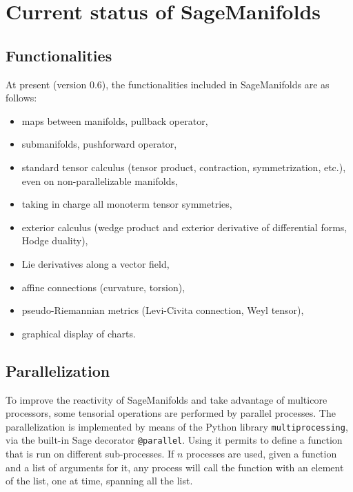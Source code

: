 \documentclass[a4paper]{jpconf}
\newcommand{\soft}[1]{\textsf{#1}}
\newcommand{\code}[1]{\texttt{#1}}
\newcommand{\Sage}{\soft{Sage}}
\newcommand{\SM}{\soft{SageManifolds}}
\begin{document}

\section{Current status of SageManifolds}

\subsection{Functionalities} \label{s:functionalities}
At present (version 0.6), the functionalities included in \SM{} are as
follows:  
\begin{itemize}
\item maps between manifolds, pullback operator,
\item submanifolds, pushforward operator,
\item standard tensor calculus (tensor product, 
contraction, symmetrization, etc.), even on non-parallelizable manifolds,
\item taking in charge all monoterm tensor symmetries, 
\item exterior calculus (wedge product and exterior derivative of differential forms,
Hodge duality),
\item Lie derivatives along a vector field,
\item affine connections (curvature, torsion),
\item pseudo-Riemannian metrics (Levi-Civita connection, Weyl tensor),
\item graphical display of charts.
\end{itemize}

\subsection{Parallelization}



To improve the reactivity of \SM{} and take advantage of
multicore processors, some tensorial operations are performed by
parallel processes. The parallelization is implemented by means of
the Python library \code{multiprocessing}, via the built-in
\Sage{} decorator \code{@parallel}. Using it permits to define a function
that is run on different sub-processes. If $n$ processes are used, given a function
and a list of arguments for it, any process will call the function
with an element of the list, one at time, spanning all the list.
\end{document}
